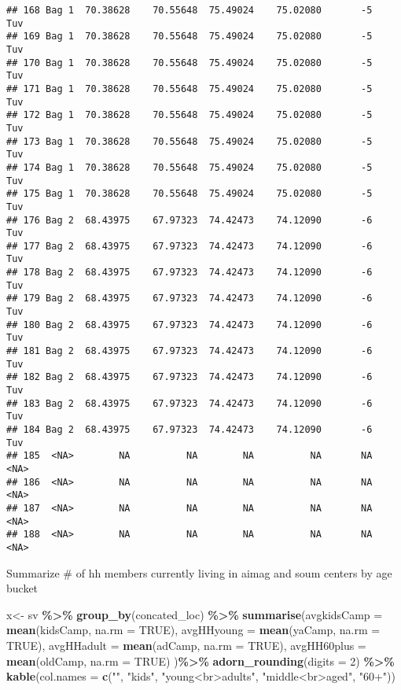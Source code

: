 \documentclass[
]{article}
\newenvironment{Shaded}{\begin{snugshade}}{\end{snugshade}}
\newcommand{\AttributeTok}[1]{\textcolor[rgb]{0.13,0.29,0.53}{#1}}
\newcommand{\ConstantTok}[1]{\textcolor[rgb]{0.56,0.35,0.01}{#1}}
\newcommand{\DecValTok}[1]{\textcolor[rgb]{0.00,0.00,0.81}{#1}}
\newcommand{\FunctionTok}[1]{\textcolor[rgb]{0.13,0.29,0.53}{\textbf{#1}}}
\newcommand{\NormalTok}[1]{#1}
\newcommand{\OtherTok}[1]{\textcolor[rgb]{0.56,0.35,0.01}{#1}}
\newcommand{\SpecialCharTok}[1]{\textcolor[rgb]{0.81,0.36,0.00}{\textbf{#1}}}
\newcommand{\StringTok}[1]{\textcolor[rgb]{0.31,0.60,0.02}{#1}}
\begin{document}
\begin{verbatim}
## 168 Bag 1  70.38628    70.55648  75.49024    75.02080       -5        Tuv
## 169 Bag 1  70.38628    70.55648  75.49024    75.02080       -5        Tuv
## 170 Bag 1  70.38628    70.55648  75.49024    75.02080       -5        Tuv
## 171 Bag 1  70.38628    70.55648  75.49024    75.02080       -5        Tuv
## 172 Bag 1  70.38628    70.55648  75.49024    75.02080       -5        Tuv
## 173 Bag 1  70.38628    70.55648  75.49024    75.02080       -5        Tuv
## 174 Bag 1  70.38628    70.55648  75.49024    75.02080       -5        Tuv
## 175 Bag 1  70.38628    70.55648  75.49024    75.02080       -5        Tuv
## 176 Bag 2  68.43975    67.97323  74.42473    74.12090       -6        Tuv
## 177 Bag 2  68.43975    67.97323  74.42473    74.12090       -6        Tuv
## 178 Bag 2  68.43975    67.97323  74.42473    74.12090       -6        Tuv
## 179 Bag 2  68.43975    67.97323  74.42473    74.12090       -6        Tuv
## 180 Bag 2  68.43975    67.97323  74.42473    74.12090       -6        Tuv
## 181 Bag 2  68.43975    67.97323  74.42473    74.12090       -6        Tuv
## 182 Bag 2  68.43975    67.97323  74.42473    74.12090       -6        Tuv
## 183 Bag 2  68.43975    67.97323  74.42473    74.12090       -6        Tuv
## 184 Bag 2  68.43975    67.97323  74.42473    74.12090       -6        Tuv
## 185  <NA>        NA          NA        NA          NA       NA       <NA>
## 186  <NA>        NA          NA        NA          NA       NA       <NA>
## 187  <NA>        NA          NA        NA          NA       NA       <NA>
## 188  <NA>        NA          NA        NA          NA       NA       <NA>
\end{verbatim}

Summarize \# of hh members currently living in aimag and soum centers by
age bucket

\begin{Shaded}
\begin{Highlighting}[]
\NormalTok{x}\OtherTok{\textless{}{-}}\NormalTok{ sv }\SpecialCharTok{\%\textgreater{}\%} \FunctionTok{group\_by}\NormalTok{(concated\_loc) }\SpecialCharTok{\%\textgreater{}\%} 
  \FunctionTok{summarise}\NormalTok{(}\AttributeTok{avgkidsCamp =} \FunctionTok{mean}\NormalTok{(kidsCamp, }\AttributeTok{na.rm =} \ConstantTok{TRUE}\NormalTok{),}
            \AttributeTok{avgHHyoung =} \FunctionTok{mean}\NormalTok{(yaCamp, }\AttributeTok{na.rm =} \ConstantTok{TRUE}\NormalTok{),}
            \AttributeTok{avgHHadult =} \FunctionTok{mean}\NormalTok{(adCamp, }\AttributeTok{na.rm =} \ConstantTok{TRUE}\NormalTok{),}
            \AttributeTok{avgHH60plus =} \FunctionTok{mean}\NormalTok{(oldCamp, }\AttributeTok{na.rm =} \ConstantTok{TRUE}\NormalTok{)}
\NormalTok{            )}\SpecialCharTok{\%\textgreater{}\%} 
  \FunctionTok{adorn\_rounding}\NormalTok{(}\AttributeTok{digits =} \DecValTok{2}\NormalTok{) }\SpecialCharTok{\%\textgreater{}\%}
  \FunctionTok{kable}\NormalTok{(}\AttributeTok{col.names =} \FunctionTok{c}\NormalTok{(}\StringTok{""}\NormalTok{, }\StringTok{"kids"}\NormalTok{, }\StringTok{"young\textless{}br\textgreater{}adults"}\NormalTok{, }\StringTok{"middle\textless{}br\textgreater{}aged"}\NormalTok{, }\StringTok{"60+"}\NormalTok{))}
\end{Highlighting}
\end{Shaded}
\end{document}
